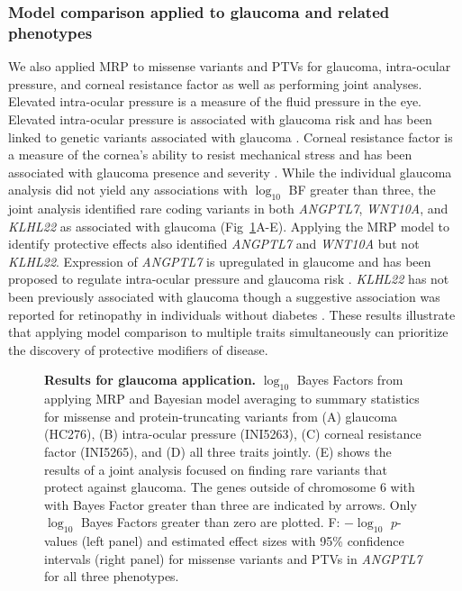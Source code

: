 \subsubsection*{Model comparison applied to glaucoma and related phenotypes}
We also applied MRP to missense variants and PTVs for glaucoma, intra-ocular pressure, and corneal resistance factor as well as performing joint analyses. Elevated intra-ocular pressure is a measure of the fluid pressure in the eye. Elevated intra-ocular pressure is associated with glaucoma risk and has been linked to genetic variants associated with glaucoma \cite{doi:10.1001/jama.2014.3192}. Corneal resistance factor is a measure of the cornea's ability to resist mechanical stress and has been associated with glaucoma presence and severity \cite{CXO:CXO414, MANSOURI2012419, GriseDulac:2012bo}. While the individual glaucoma analysis did not yield any associations with $\log_{10}$ BF greater than three, the joint analysis identified rare coding variants in both \textit{ANGPTL7}, \textit{WNT10A}, and \textit{KLHL22} as associated with glaucoma (Fig~\ref{glaucoma_bma}A-E). Applying the MRP model to identify protective effects also identified \textit{ANGPTL7} and \textit{WNT10A} but not \textit{KLHL22}. Expression of \textit{ANGPTL7} is upregulated in glaucome and has been proposed to regulate intra-ocular pressure and glaucoma risk \cite{Comes:2011ex, Kuchtey:2008ek}. \textit{KLHL22} has not been previously associated with glaucoma though a suggestive association was reported for retinopathy in individuals without diabetes \cite{10.1371/journal.pone.0054232}. These results illustrate that applying model comparison to multiple traits simultaneously can prioritize the discovery of protective modifiers of disease. 

\begin{figure}[!h]
\caption{{\bf Results for glaucoma application.}
$\log_{10}$ Bayes Factors from applying MRP and Bayesian model averaging to summary statistics for missense and protein-truncating variants from (A) glaucoma (HC276), (B) intra-ocular pressure (INI5263), (C) corneal resistance factor (INI5265), and (D) all three traits jointly. (E) shows the results of a joint analysis focused on finding rare variants that protect against glaucoma. The genes outside of chromosome 6 with with Bayes Factor greater than three are indicated by arrows. Only $\log_{10}$ Bayes Factors greater than zero are plotted. F: $-\log_{10}$ $p$-values (left panel) and estimated effect sizes with 95\% confidence intervals (right panel) for missense variants and PTVs in \textit{ANGPTL7} for all three phenotypes.}
\label{glaucoma_bma}
\end{figure}

